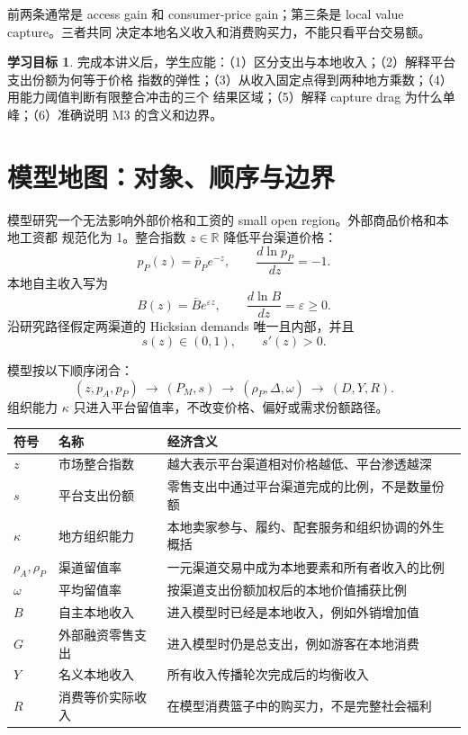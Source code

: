 \documentclass[UTF8,11pt,scheme=chinese,fontset=fandol]{ctexart}
\theoremstyle{definition}
\newtheorem{learninggoal}{学习目标}[section]
\begin{document}
前两条通常是 access gain 和 consumer-price gain；第三条是 local value capture。三者共同
决定本地名义收入和消费购买力，不能只看平台交易额。

\begin{learninggoal}
完成本讲义后，学生应能：（1）区分支出与本地收入；（2）解释平台支出份额为何等于价格
指数的弹性；（3）从收入固定点得到两种地方乘数；（4）用能力阈值判断有限整合冲击的三个
结果区域；（5）解释 capture drag 为什么单峰；（6）准确说明 M3 的含义和边界。
\end{learninggoal}

\section{模型地图：对象、顺序与边界}

模型研究一个无法影响外部价格和工资的 small open region。外部商品价格和本地工资都
规范化为 1。整合指数 \(z\in\mathbb R\) 降低平台渠道价格：
\[
p_P(z)=\bar p_Pe^{-z},
\qquad \frac{d\ln p_P}{dz}=-1.
\]
本地自主收入写为
\[
B(z)=\bar Be^{\varepsilon z},
\qquad \frac{d\ln B}{dz}=\varepsilon\geq0.
\]
沿研究路径假定两渠道的 Hicksian demands 唯一且内部，并且
\[
s(z)\in(0,1),\qquad s'(z)>0.
\]

模型按以下顺序闭合：
\[
\boxed{
(z,p_A,p_P)\ \longrightarrow\ (P_M,s)\ \longrightarrow\
(\rho_P,\Delta,\omega)\ \longrightarrow\ (D,Y,R).}
\]
组织能力 \(\kappa\) 只进入平台留值率，不改变价格、偏好或需求份额路径。

\begin{center}
\small
\begin{tabularx}{\textwidth}{>{\centering\arraybackslash}p{1.8cm}p{3.4cm}X}
\toprule
符号 & 名称 & 经济含义 \\
\midrule
\(z\) & 市场整合指数 & 越大表示平台渠道相对价格越低、平台渗透越深 \\
\(s\) & 平台支出份额 & 零售支出中通过平台渠道完成的比例，不是数量份额 \\
\(\kappa\) & 地方组织能力 & 本地卖家参与、履约、配套服务和组织协调的外生概括 \\
\(\rho_A,\rho_P\) & 渠道留值率 & 一元渠道交易中成为本地要素和所有者收入的比例 \\
\(\omega\) & 平均留值率 & 按渠道支出份额加权后的本地价值捕获比例 \\
\(B\) & 自主本地收入 & 进入模型时已经是本地收入，例如外销增加值 \\
\(G\) & 外部融资零售支出 & 进入模型时仍是总支出，例如游客在本地消费 \\
\(Y\) & 名义本地收入 & 所有收入传播轮次完成后的均衡收入 \\
\(R\) & 消费等价实际收入 & 在模型消费篮子中的购买力，不是完整社会福利 \\
\bottomrule
\end{tabularx}
\end{center}
\normalsize
\end{document}
